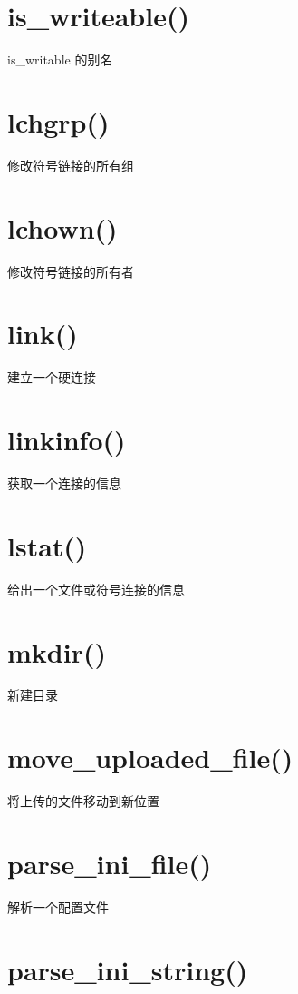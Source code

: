 \section{is\_writeable()}

is\_writable 的别名

\section{lchgrp()}

修改符号链接的所有组

\section{lchown()}

修改符号链接的所有者

\section{link()}

建立一个硬连接

\section{linkinfo()}

获取一个连接的信息

\section{lstat()}

给出一个文件或符号连接的信息

\section{mkdir()}

新建目录

\section{move\_uploaded\_file()}

将上传的文件移动到新位置

\section{parse\_ini\_file()}

解析一个配置文件

\section{parse\_ini\_string()}

